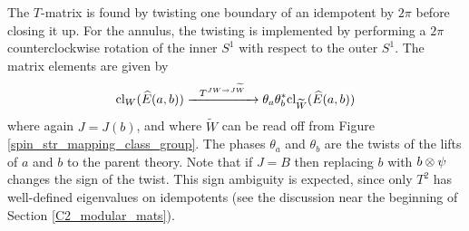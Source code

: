 The $T$-matrix is found by twisting one boundary of an idempotent by $2\pi$ before closing it up. 
For the annulus, the twisting is implemented by performing a $2\pi$ counterclockwise rotation of the inner $S^1$ with respect to the outer $S^1$.
The matrix elements are given by
\begin{align}
\text{cl}_W(\widehat{E}(a,b)) \xrightarrow{\; \; \; T^{JW \rightarrow J\widetilde{W}}\;\;\; } \theta_a \theta_b^* \text{cl}_{\widetilde{W}}(\widehat{E}(a,b))
\end{align}
where again $J = J(b)$, and where $\widetilde{W}$ can be read off from Figure \ref{spin_str_mapping_class_group}.
The phases $\theta_a$ and $\theta_b$ are the twists of the lifts of $a$ and $b$ to the parent theory.
Note that if $J = B$ then replacing $b$ with $b\otimes \psi$ changes the sign of the twist.
This sign ambiguity is expected, since only $T^2$ has well-defined eigenvalues 
on idempotents (see the discussion near the beginning of Section \ref{C2_modular_mats}). 







